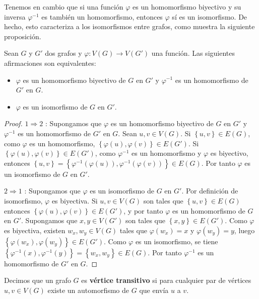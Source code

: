 Tenemos en cambio que si una función $\varphi$ es un homomorfismo biyectivo y su inversa $\varphi^{-1}$ es también un homomorfismo, entonces $\varphi$ sí es un isomorfismo. De hecho, esto caracteriza a los isomorfismos entre grafos, como muestra la siguiente proposición.\clearpage
\begin{Prop}
   Sean $G$ y $G'$ dos grafos y $\varphi:V(G)\to V(G')$ una función. Las siguientes afirmaciones son equivalentes:
   \begin{itemize}
      \item[1.] $\varphi$ es un homomorfismo biyectivo de $G$ en $G'$ y $\varphi^{-1}$ es un homomorfismo de $G'$ en $G$.
      \item[2.] $\varphi$ es un isomorfismo de $G$ en $G'$.
   \end{itemize}
\end{Prop}
\begin{proof}
   $1\Rightarrow 2$ : Supongamos que $\varphi$ es un homomorfismo biyectivo de $G$ en $G'$ y $\varphi^{-1}$ es un homomorfismo de $G'$ en $G$. Sean $u,v \in V(G)$. Si $\left\lbrace u,v\right\rbrace\in E(G)$, como $\varphi$ es un homomorfismo, $\left\lbrace \varphi(u),\varphi(v)\right\rbrace\in E(G')$. Si $\left\lbrace \varphi(u),\varphi(v)\right\rbrace\in E(G')$, como $\varphi^{-1}$ es un homomorfismo y $\varphi$ es biyectivo, entonces $\left\lbrace u,v\right\rbrace=\left\lbrace \varphi^{-1}(\varphi(u)),\varphi^{-1}(\varphi(v))\right\rbrace\in E(G)$. Por tanto $\varphi$ es un isomorfismo de $G$ en $G'$.\par
   $2\Rightarrow 1$ : Supongamos que $\varphi$ es un isomorfismo de $G$ en $G'$. Por definición de isomorfismo, $\varphi$ es biyectiva. Si $u,v\in V(G)$ son tales que $\left\lbrace u,v\right\rbrace\in E(G)$ entonces $\left\lbrace \varphi(u),\varphi(v)\right\rbrace\in E(G')$, y por tanto $\varphi$ es un homomorfismo de $G$ en $G'$. Supongamos que $x,y\in V(G')$ son tales que $\left\lbrace x,y\right\rbrace\in E(G')$. Como $\varphi$ es biyectiva, existen $w_x,w_y\in V(G)$ tales que $\varphi(w_x)=x$ y $\varphi(w_y)=y$, luego $\left\lbrace \varphi(w_x),\varphi(w_y)\right\rbrace\in E(G')$. Como $\varphi$ es un isomorfismo, se tiene $\left\lbrace \varphi^{-1}(x),\varphi^{-1}(y)\right\rbrace=\left\lbrace w_x,w_y\right\rbrace\in E(G)$. Por tanto $\varphi^{-1}$ es un homomorfismo de $G'$ en $G$.
\end{proof}
\begin{Def}
   Decimos que un grafo $G$ es \textbf{vértice transitivo} si para cualquier par de vértices $u,v\in V(G)$ existe un automorfismo de $G$ que envía $u$ a $v$.    
\end{Def}
